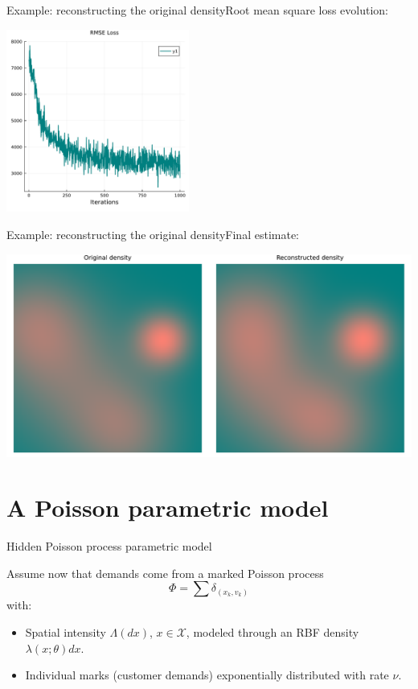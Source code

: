 \documentclass[aspectratio=169]{beamer}
\begin{document}
\begin{frame}{Example: reconstructing the original density}{Root mean square loss evolution:}

	\begin{center}
		\includegraphics[width=0.45\textwidth]{figuras/rmse_loss.pdf}
	\end{center}		
		
\end{frame}

\begin{frame}{Example: reconstructing the original density}{Final estimate:}

	\includegraphics[width=\columnwidth]{figuras/least_squares_result.pdf}			

\end{frame}

\section{A Poisson parametric model}

\begin{frame}{Hidden Poisson process parametric model}

	Assume now that demands come from a \alert{marked Poisson process} 
	$$\Phi=\sum \delta_{(x_k,v_k)}$$ with:
	\vfill
	\begin{itemize}
		\item Spatial intensity $\Lambda(dx)$, $x\in\mathcal{X}$, modeled through an RBF density $\lambda(x;\theta)dx$.
		\vfill
		\item Individual marks (customer demands) exponentially distributed with rate $\nu$.
	\end{itemize}
	
\end{frame}
\end{document}
